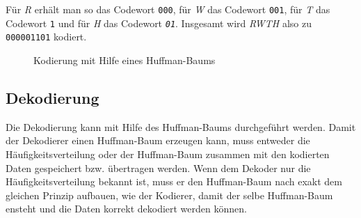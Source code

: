 \documentclass[twoside,11pt,a4paper]{article}
\theoremstyle{break}
\begin{document}
Für \emph{R} erhält man so das Codewort {\tt000}, für \emph{W} das
Codewort {\tt001}, für \emph{T} das Codewort {\tt1} und für \emph{H}
das Codewort \emph{\tt01}. Insgesamt wird \emph{RWTH} also zu
{\tt000001101} kodiert.


\begin{figure}[h]
\centering
{}
\caption{Kodierung mit Hilfe eines Huffman-Baums} \label{fig:HKOD}
\end{figure}

\subsection{Dekodierung}

Die Dekodierung kann mit Hilfe des Huffman-Baums durchgeführt
werden. Damit der Dekodierer einen Huffman-Baum erzeugen kann, muss
entweder die Häufigkeitsverteilung oder der Huffman-Baum zusammen mit
den kodierten Daten gespeichert bzw. übertragen werden. Wenn dem
Dekoder nur die Häufigkeitsverteilung bekannt ist, muss er den
Huffman-Baum nach exakt dem gleichen Prinzip aufbauen, wie der
Kodierer, damit der selbe Huffman-Baum ensteht und die Daten korrekt
dekodiert werden können.
\end{document}
